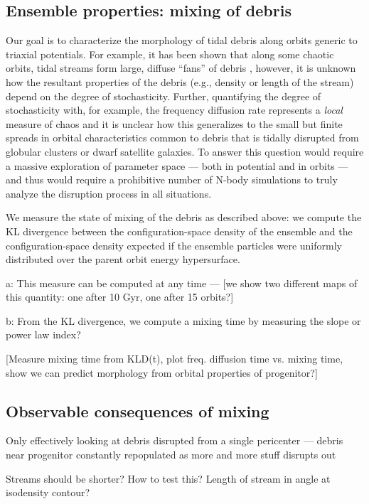 \documentclass[letterpaper,12pt,preprint]{aastex}
\begin{document}
\subsection{Ensemble properties: mixing of debris}

Our goal is to characterize the morphology of tidal debris along orbits generic to triaxial potentials. For example, it has been shown that along some chaotic orbits, tidal streams form large, diffuse ``fans'' of debris \citep[e.g.][]{fardal14, pearson15}, however, it is unknown how the resultant properties of the debris (e.g., density or length of the stream) depend on the degree of stochasticity. Further, quantifying the degree of stochasticity with, for example, the frequency diffusion rate represents a \emph{local} measure of chaos and it is unclear how this generalizes to the small but finite spreads in orbital characteristics common to debris that is tidally disrupted from globular clusters or dwarf satellite galaxies. To answer this question would require a massive exploration of parameter space --- both in potential and in orbits --- and thus would require a prohibitive number of N-body simulations to truly analyze the disruption process in all situations.

We measure the state of mixing of the debris as described above: we compute the KL divergence between the configuration-space density of the ensemble and the configuration-space density expected if the ensemble particles were uniformly distributed over the parent orbit energy hypersurface. 

a:
This measure can be computed at any time --- [we show two different maps of this quantity: one after 10 Gyr, one after 15 orbits?]

b: 
From the KL divergence, we compute a mixing time by measuring the slope or power law index?

[Measure mixing time from KLD(t), plot freq. diffusion time vs. mixing time, show we can predict morphology from orbital properties of progenitor?]

\subsection{Observable consequences of mixing}

Only effectively looking at debris disrupted from a single pericenter --- debris near progenitor constantly repopulated as more and more stuff disrupts out

Streams should be shorter? How to test this? Length of stream in angle at isodensity contour?
\end{document}
